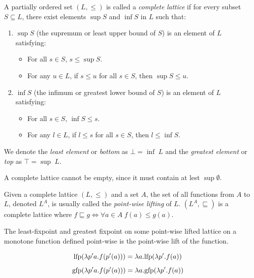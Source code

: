 \documentclass[
  10pt,       %
  twoside,    %
  a4paper,    %
  english,    %
  tikz,       %
  openright,  %
]{book}
\begin{document}
\begin{definition}
  A partially ordered set \((L, \leq)\) is called a \emph{complete lattice} if
  for every subset \(S \subseteq L\), there exist elements \(\sup S\) and
  \(\inf S\) in \(L\) such that: 
  \begin{enumerate}
    \item \(\sup S\) (the supremum or least upper bound of \(S\)) is an
      element of \(L\) satisfying: 
      \begin{itemize}
        \item For all \(s \in S\), \(s \leq \sup S\).
        \item For any \(u \in L\), if \(s \leq u\) for all \(s \in S\), then
          \(\sup S \leq u\). \end{itemize}
    \item \(\inf S\) (the infimum or greatest lower bound of \(S\)) is an
      element of \(L\) satisfying: 
      \begin{itemize}
        \item For all \(s \in S\), \(\inf S \leq s\).
        \item For any \(l \in L\), if \(l \leq s\) for all \(s \in S\), then
          \(l \leq \inf S\). 
      \end{itemize}
  \end{enumerate}

  We denote the \textit{least element} or \textit{bottom} as $\bot = \inf \; L$ 
  and the \textit{greatest element} or \textit{top} as $\top = \sup \; L$.
\end{definition}

\begin{observation}
  A complete lattice cannot be empty, since it must contain at lest
  $\sup \emptyset$.
\end{observation}

\begin{definition}
Given a complete lattice $(L, \leq)$ and a set $A$, the set of all functions
from $A$ to $L$, denoted $L^A$, is usually called the \textit{point-wise
lifting} of $L$.
$(L^A, \sqsubseteq)$ is a complete lattice where $f \sqsubseteq g \iff \forall
a \in A \; f(a) \leq g(a)$.
\end{definition}

\begin{observation}
  \label{th:pointfix}
  The least-fixpoint and greatest fixpoint on some point-wise lifted lattice on 
  a monotone function defined point-wise is the point-wise lift of the function.

  $$\mathrm{lfp}(\lambda p' a . f(p'(a))) = \lambda a . \mathrm{lfp}(\lambda p' . f(a))$$
  $$\mathrm{gfp}(\lambda p' a . f(p'(a))) = \lambda a . \mathrm{gfp}(\lambda p' . f(a))$$
\end{observation}
\end{document}
